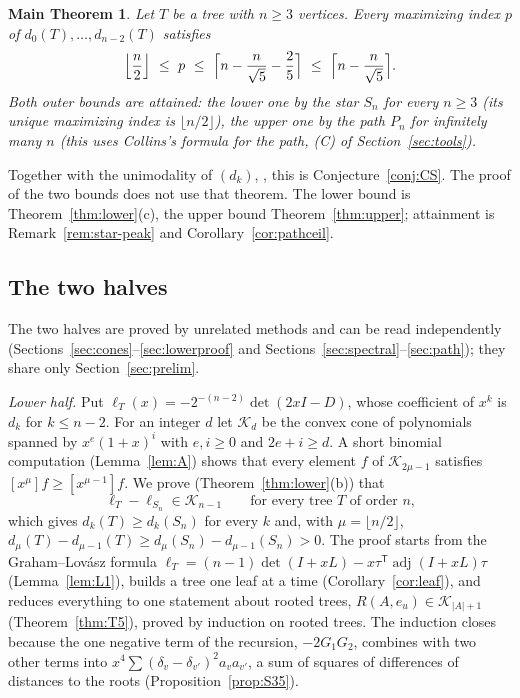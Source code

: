 \documentclass[11pt]{amsart}
\newtheorem*{maintheorem}{Main Theorem}
\theoremstyle{definition}
\theoremstyle{remark}
\newcommand{\adj}{\operatorname{adj}}
\newcommand{\K}{\mathcal K}
\newcommand{\T}{\mathsf T}
\begin{document}
\begin{maintheorem}
Let $T$ be a tree with $n\ge3$ vertices. Every maximizing index $p$ of
$d_0(T),\dots,d_{n-2}(T)$ satisfies
\[
\Bigl\lfloor\frac n2\Bigr\rfloor\ \le\ p\ \le\ \Bigl\lceil n-\frac n{\sqrt5}-\frac25\Bigr\rceil\ \le\ \Bigl\lceil n-\frac n{\sqrt5}\Bigr\rceil .
\]
Both outer bounds are attained: the lower one by the star $S_n$ for every
$n\ge3$ (its unique maximizing index is $\lfloor n/2\rfloor$), the upper one
by the path $P_n$ for infinitely many $n$ (this uses Collins's formula for
the path, (C) of Section~\ref{sec:tools}).
\end{maintheorem}

Together with the unimodality of $(d_k)$, \cite[Theorem~2.1]{AAB}, this is
Conjecture~\ref{conj:CS}. The proof of the two bounds does not use that
theorem. The
lower bound is Theorem~\ref{thm:lower}(c), the upper bound
Theorem~\ref{thm:upper}; attainment is Remark~\ref{rem:star-peak} and
Corollary~\ref{cor:pathceil}.

\subsection*{The two halves}
The two halves are proved by unrelated methods and can be read independently
(Sections~\ref{sec:cones}--\ref{sec:lowerproof} and
Sections~\ref{sec:spectral}--\ref{sec:path}); they share only
Section~\ref{sec:prelim}.

\emph{Lower half.} Put $\ell_T(x)=-2^{-(n-2)}\det(2xI-D)$, whose coefficient
of $x^k$ is $d_k$ for $k\le n-2$. For an integer $d$ let $\K_d$ be the convex
cone of polynomials spanned by $x^e(1+x)^i$ with $e,i\ge0$ and $2e+i\ge d$.
A short binomial computation (Lemma~\ref{lem:A}) shows that every element $f$
of $\K_{2\mu-1}$ satisfies $[x^\mu]f\ge[x^{\mu-1}]f$. We prove
(Theorem~\ref{thm:lower}(b)) that
\[
\ell_T-\ell_{S_n}\in\K_{n-1}\qquad\text{for every tree $T$ of order $n$,}
\]
which gives $d_k(T)\ge d_k(S_n)$ for every $k$ and, with $\mu=\lfloor n/2\rfloor$,
$d_\mu(T)-d_{\mu-1}(T)\ge d_\mu(S_n)-d_{\mu-1}(S_n)>0$. The proof starts from
the Graham--Lov\'asz formula $\ell_T=(n-1)\det(I+xL)-x\tau^\T\adj(I+xL)\tau$
(Lemma~\ref{lem:L1}), builds a tree one leaf at a time
(Corollary~\ref{cor:leaf}), and reduces everything to one statement about
rooted trees, $R(A,e_u)\in\K_{|A|+1}$ (Theorem~\ref{thm:T5}), proved by
induction on rooted trees. The induction closes because the one negative
term of the recursion, $-2G_1G_2$, combines with two other terms into
$x^4\sum(\delta_v-\delta_{v'})^2a_va_{v'}$, a sum of squares of differences of
distances to the roots (Proposition~\ref{prop:S35}).
\end{document}
